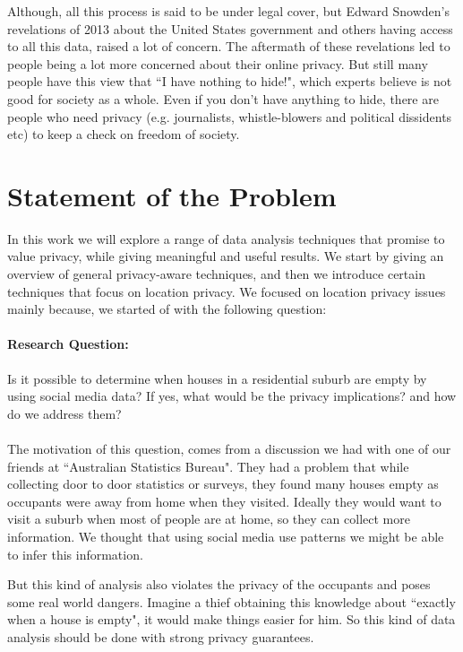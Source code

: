 \documentclass[12pt]{report}
\theoremstyle{named}
\begin{document}
Although, all this process is said to be under legal cover, but Edward Snowden's revelations of 2013\cite{SnowdenStory} about the United States government and others having access to all this data, raised a lot of concern. The aftermath of these revelations led to people being a lot more concerned about their online privacy. But still many people have this view that ``I have nothing to hide!", which experts believe is not good for society as a whole. Even if you don't have anything to hide, there are people who need privacy (e.g. journalists, whistle-blowers and political dissidents etc) to keep a check on freedom of society.


\section{Statement of the Problem}
In this work we will explore a range of data analysis techniques that promise to value privacy, while giving meaningful and useful results. We start by giving an overview of general privacy-aware techniques, and then we introduce certain techniques that focus on location privacy. We focused on location privacy issues mainly because, we started of with the following question:

\paragraph{Research Question:} Is it possible to determine when houses in a residential suburb are empty by using social media data? If yes, what would be the privacy implications? and how do we address them?
\paragraph{}
The motivation of this question, comes from a discussion we had with one of our friends at ``Australian Statistics Bureau". They had a problem that while collecting door to door statistics or surveys, they found many houses empty as occupants were away from home when they visited. Ideally they would want to visit a suburb when most of people are at home, so they can collect more information. We thought that using social media use patterns we might be able to infer this information. 

But this kind of analysis also violates the privacy of the occupants and poses some real world dangers. Imagine a thief obtaining this knowledge about ``exactly when a house is empty", it would make things easier for him. So this kind of data analysis should be done with strong privacy guarantees.  
\end{document}
